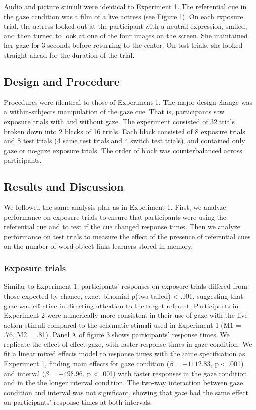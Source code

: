 \documentclass[a4paper,man,natbib]{apa6}
\begin{document}
Audio and picture stimuli were identical to Experiment 1. The
referential cue in the gaze condition was a film of a live actress (see
Figure 1). On each exposure trial, the actress looked out at the
participant with a neutral expression, smiled, and then turned to look
at one of the four images on the screen. She maintained her gaze for 3
seconds before returning to the center. On test trials, she looked
straight ahead for the duration of the trial.

\subsection{Design and Procedure}\label{design-and-procedure-1}

Procedures were identical to those of Experiment 1. The major design
change was a within-subjects manipulation of the gaze cue. That is,
participants saw exposure trials with and without gaze. The experiment
consisted of 32 trials broken down into 2 blocks of 16 trials. Each
block consisted of 8 exposure trials and 8 test trials (4 same test
trials and 4 switch test trials), and contained only gaze or no-gaze
exposure trials. The order of block was counterbalanced across
participants.

\subsection{Results and Discussion}\label{results-and-discussion-1}

We followed the same analysis plan as in Experiment 1. First, we analyze
performance on exposure trials to ensure that participants were using
the referential cue and to test if the cue changed response times. Then
we analyze performance on test trials to measure the effect of the
presence of referential cues on the number of word-object links learners
stored in memory.

\subsubsection{Exposure trials}\label{exposure-trials-1}

Similar to Experiment 1, participants' responses on exposure trials
differed from those expected by chance, exact binomial p(two-tailed)
\textless{} .001, suggesting that gaze was effective in directing
attention to the target referent. Participants in Experiment 2 were
numerically more consistent in their use of gaze with the live action
stimuli compared to the schematic stimuli used in Experiment 1 (M1 =
.76, M2 = .81). Panel A of figure 3 shows participants' response times.
We replicate the effect of effect gaze, with faster response times in
gaze condition. We fit a linear mixed effects model to response times
with the same specification as Experiment 1, finding main effects for
gaze condition (\(\beta = -1112.83\), p \textless{} .001) and interval
(\(\beta = -498.96\), p \textless{} .001) with faster responses in the
gaze condition and in the the longer interval condition. The two-way
interaction between gaze condition and interval was not significant,
showing that gaze had the same effect on participants' response times at
both intervals.
\end{document}
